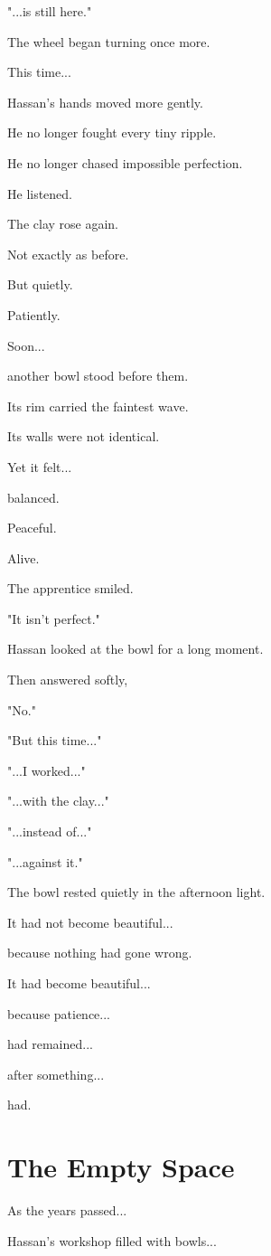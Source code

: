 \documentclass[12pt,openany]{book}
\begin{document}
"...is still here."

The wheel began turning once more.

This time...

Hassan's hands moved more gently.

He no longer fought every tiny ripple.

He no longer chased impossible perfection.

He listened.

The clay rose again.

Not exactly as before.

But quietly.

Patiently.

Soon...

another bowl stood before them.

Its rim carried the faintest wave.

Its walls were not identical.

Yet it felt...

balanced.

Peaceful.

Alive.

The apprentice smiled.

"It isn't perfect."

Hassan looked at the bowl for a long moment.

Then answered softly,

"No."

"But this time..."

"...I worked..."

"...with the clay..."

"...instead of..."

"...against it."

The bowl rested quietly in the afternoon light.

It had not become beautiful...

because nothing had gone wrong.

It had become beautiful...

because patience...

had remained...

after something...

had.
\section*{The Empty Space}

As the years passed...

Hassan's workshop filled with bowls...
\end{document}
